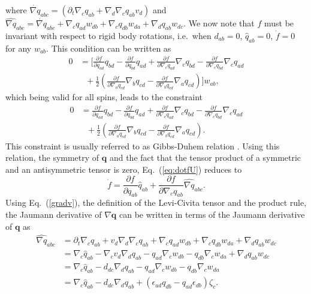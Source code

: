 where $\dot{\nabla q}_{abc} = \left(\partial_t \nabla_c q_{ab} + \nabla_d \nabla_c q_{ab} v_d\right)$ and $\widehat{\nabla q}_{abc} = \dot{\nabla q}_{abc} +\nabla_cq_{ad} w_{db}+ \nabla_cq_{db} w_{da}+ \nabla_d q_{ab} w_{dc}$. We now note that $f$ must be invariant with respect to rigid body rotations, i.e.~when $d_{ab}=0$, $\widehat{q}_{ab}=0$, $\dot{f}=0$ for any $w_{ab}$. This condition can be written as
\begin{equation}
	\begin{aligned}
		0 &= \bigg[ \frac{\partial f}{\partial q_{ad}} q_{bd}  - \frac{\partial f}{\partial q_{bd}} q_{ad}  + \frac{\partial f}{\partial \nabla_c q_{ad}} \nabla_cq_{bd}-\frac{\partial f}{\partial \nabla_c q_{bd}}  \nabla_c q_{ad} \\
		&~~~+ \frac{1}{2} \left(\frac{\partial f}{\partial \nabla_a q_{cd}} \nabla_b q_{cd}-\frac{\partial f}{\partial \nabla_b q_{cd}} \nabla_a q_{cd}\right) \bigg] w_{ab},
	\end{aligned}
\end{equation}
which being valid for all spins, leads to the constraint 
\begin{equation}
	\begin{aligned}
		0 &=  \frac{\partial f}{\partial q_{ad}} q_{bd}  - \frac{\partial f}{\partial q_{bd}} q_{ad}  + \frac{\partial f}{\partial \nabla_c q_{ad}} \nabla_cq_{bd}-\frac{\partial f}{\partial \nabla_c q_{bd}}  \nabla_c q_{ad} \\
		&~~~+ \frac{1}{2} \left(\frac{\partial f}{\partial \nabla_a q_{cd}} \nabla_b q_{cd}-\frac{\partial f}{\partial \nabla_b q_{cd}} \nabla_a q_{cd}\right). 
	\end{aligned}
\end{equation}
This constraint is usually referred to as Gibbs-Duhem relation \cite{julicher2018}. Using this relation, the symmetry of $\bm{q}$ and the fact that the tensor product of a symmetric  and an antisymmetric tensor is zero, Eq.~(\ref{eq:dotfU}) reduces to
\begin{equation}
	\label{eq:dotfU2}  
	\dot{f}= \frac{\partial f}{\partial q_{ab}} \widehat{q}_{ab} +  \frac{\partial f}{\partial \nabla_c q_{ab}}\widehat{\nabla q}_{abc}.
\end{equation}
Using Eq.~(\ref{gradv}), the definition of the Levi-Civita tensor and the product rule,  the Jaumann derivative of $\nabla \bm{q}$ can be written in terms of the Jaumann derivative of $\bm{q}$ as
\begin{equation}
	\begin{aligned}
		\widehat{\nabla q}_{abc} &= \partial_t \nabla_c q_{ab} + v_d \nabla_d \nabla_c q_{ab} + \nabla_c q_{ad} w_{db} + \nabla_c q_{db} w_{da} + \nabla_d q_{ab} w_{dc}\\
		&= \nabla_c \widehat{q}_{ab} - \nabla_c v_d \nabla_d q_{ab} - q_{ad} \nabla_c w_{db} - q_{db} \nabla_c w_{da} + \nabla_d q_{ab} w_{dc}\\
		&= \nabla_c \widehat{q}_{ab} - d_{dc} \nabla_d q_{ab} - q_{ad} \nabla_c w_{db} - q_{db} \nabla_c w_{da} \\
		&= \nabla_c \widehat{q}_{ab} - d_{dc} \nabla_d q_{ab} + \left(\epsilon_{ad} q_{db} - q_{ad}  \epsilon_{db} \right) \zeta_c.
	\end{aligned}
\end{equation}
